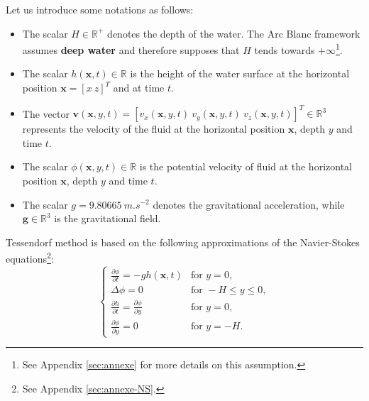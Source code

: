\documentclass[11pt]{article}
\def\Framework{The Arc Blanc framework\xspace}
\begin{document}
Let us introduce some notations as follows:
\begin{itemize}
	\item The scalar $H\in\mathbb R^+$ denotes the depth of the water. \Framework assumes \textbf{deep water} and therefore supposes that $H$ tends towards $+\infty$\footnote{See Appendix \ref{sec:annexe} for more details on this assumption.}.
	\item The scalar $h(\mathbf x, t)\in\mathbb R$ is the height of the water surface at the horizontal position $\mathbf x=\left[x~z\right]^T$ and at time $t$.
	\item The vector $\mathbf{v}(\mathbf x, y, t) =  \left[v_x(\mathbf x, y, t)\ v_y(\mathbf x, y, t)\ v_z(\mathbf x, y, t)\right]^T\in\mathbb R^3$ represents the velocity of the fluid at the horizontal position $\mathbf x$, depth $y$ and time $t$.
	\item The scalar $\phi(\mathbf x,y,t)\in\mathbb R$ is the potential velocity of fluid at the horizontal position $\mathbf x$, depth $y$ and time $t$.
	\item The scalar $g=9.80665~m.s^{-2}$ denotes the gravitational acceleration, while $\mathbf g\in\mathbb R^3$ is the gravitational field.
\end{itemize}

Tessendorf method is based on the following approximations of the Navier-Stokes equations\footnote{See Appendix  \ref{sec:annexe-NS}.}:
\begin{equation}
	\label{equa:systemTessendorf}
	\left\lbrace
	\begin{array}{ll}
		\frac{\partial\phi}{\partial t} = -gh(\mathbf x,t)            & \text{for }y=0,            \\
		\Delta\phi=0                                                  & \text{for }-H\leq y\leq 0, \\
		\frac{\partial h}{\partial t}=\frac{\partial\phi}{\partial y} & \text{for }y=0,            \\
		\frac{\partial\phi}{\partial y}=0                             & \text{for }y=-H.
	\end{array}
	\right.
\end{equation}

\end{document}
